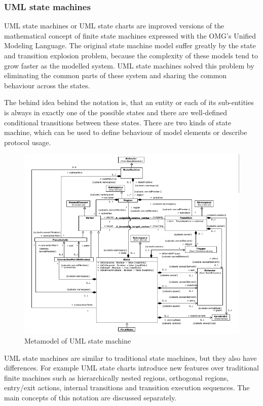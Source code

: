
\subsubsection{UML state machines}
\label{ssub:umlstatemachine}

UML state machines or UML state charts are improved versions of the mathematical concept of finite state machines expressed with the OMG's Unified Modeling Language. The original state machine model suffer greatly by the state and transition explosion problem, because the complexity of these models tend to grow faster as the modelled system. UML state machines solved this problem by eliminating the common parts of these system and sharing the common behaviour across the states.

The behind idea behind the notation is, that an entity or each of its sub-entities is always in exactly one of the possible states and there are well-defined conditional transitions between these states. There are two kinds of state machine, which can be used to define behaviour of model elements or describe protocol usage.

\begin{figure}[htp]
\centering
\includegraphics[scale=0.5]{figures/statemachine_metamodel}
\caption{Metamodel of UML state machine}
\label{fig:statemachine_metamodel}
\end{figure}

UML state machines are similar to traditional state machines, but they also have differences. For example UML state charts introduce new features over traditional finite machines such as hierarchically nested regions, orthogonal regions, entry/exit actions, internal transitions and transition execution sequences. The main concepts of this notation are discussed separately.

